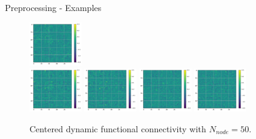 \documentclass{beamer}
\begin{document}
\begin{frame}{Preprocessing - Examples}
\begin{figure}[H]
        \includegraphics[width=0.2\textwidth]{../Analysis/DFC/size=480_step=180_rho=0.1/node=50_id=100206/c_14.jpg} \\
        \includegraphics[width=0.2\textwidth]{../Analysis/DFC/size=480_step=180_rho=0.1/node=50_id=100206/c_16.jpg}
        \includegraphics[width=0.2\textwidth]{../Analysis/DFC/size=480_step=180_rho=0.1/node=50_id=100206/c_18.jpg}
        \includegraphics[width=0.2\textwidth]{../Analysis/DFC/size=480_step=180_rho=0.1/node=50_id=100206/c_20.jpg}
        \includegraphics[width=0.2\textwidth]{../Analysis/DFC/size=480_step=180_rho=0.1/node=50_id=100206/c_22.jpg} \\
        \caption{Centered dynamic functional connectivity with $N_{node} = 50$.}
    \end{figure}

\end{frame}
\end{document}
